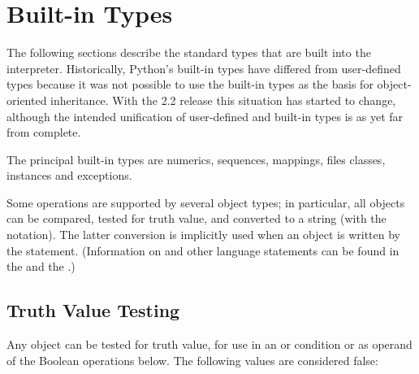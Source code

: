 \section{Built-in Types \label{types}}

The following sections describe the standard types that are built into
the interpreter.  Historically, Python's built-in types have differed
from user-defined types because it was not possible to use the built-in
types as the basis for object-oriented inheritance. With the 2.2
release this situation has started to change, although the intended
unification of user-defined and built-in types is as yet far from
complete.

The principal built-in types are numerics, sequences, mappings, files
classes, instances and exceptions.

Some operations are supported by several object types; in particular,
all objects can be compared, tested for truth value, and converted to
a string (with the  notation).  The latter
conversion is implicitly used when an object is written by the
 statement.
(Information on 
and other language statements can be found in the
 and the
.)


\subsection{Truth Value Testing\label{truth}}

Any object can be tested for truth value, for use in an  or
 condition or as operand of the Boolean operations below.
The following values are considered false:

